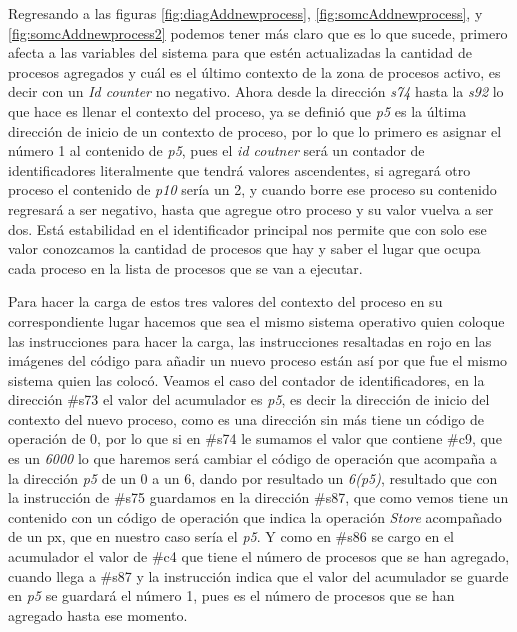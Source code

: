 \documentclass[letterpaper,12pt,oneside]{book}
\begin{document}
			Regresando a las figuras  \ref{fig:diagAddnewprocess}, \ref{fig:somcAddnewprocess}, y \ref{fig:somcAddnewprocess2} podemos tener más claro que es lo que
			sucede, primero afecta a las variables del sistema para que estén actualizadas la cantidad de procesos agregados y cuál es el último
			contexto de la zona de procesos activo, es decir con un \textit{Id counter} no negativo. Ahora desde la dirección \textit{s74} hasta
			la \textit{s92} lo que hace es llenar el contexto del proceso, ya se definió que \textit{p5} es la última dirección de inicio de un contexto
			de proceso, por lo que lo primero es asignar el número 1 al contenido de \textit{p5}, pues el \textit{id coutner} será un contador de identificadores
			literalmente que tendrá valores ascendentes, si agregará otro proceso el contenido de \textit{p10} sería un 2, y cuando borre ese proceso
			su contenido regresará a ser negativo, hasta que agregue otro proceso y su valor vuelva a ser dos. Está estabilidad en el identificador principal
			nos permite que con solo ese valor conozcamos la cantidad de procesos que hay  y saber el lugar que ocupa cada proceso en la lista
			de procesos que se van a ejecutar.
			
			Para hacer la carga de estos tres valores del contexto del proceso en su correspondiente lugar hacemos que sea el mismo sistema operativo
			quien coloque las instrucciones para hacer la carga, las instrucciones resaltadas en rojo en las imágenes del código para añadir
			un nuevo proceso están así por que fue el mismo sistema quien las colocó. Veamos el caso del contador de identificadores, en la dirección
			\#s73 el valor del acumulador es \textit{p5}, es decir la dirección de inicio del contexto del nuevo proceso, como es una dirección sin más
			tiene un código de operación de 0, por lo que si en \#s74 le sumamos el valor que contiene \#c9, que es un \textit{6000} lo que haremos
			será cambiar el código de operación que acompaña a la dirección \textit{p5} de un 0 a un 6, dando por resultado un \textit{6(p5)},
			resultado que con la instrucción de \#s75 guardamos en la dirección \#s87, que como vemos tiene un contenido con un código de operación
			que indica la operación \textit{Store} acompañado de un px, que en nuestro caso sería el \textit{p5}. Y como en \#s86 se cargo
			en el acumulador el valor de \#c4 que tiene el número de procesos que se han agregado, cuando llega a \#s87 y la instrucción indica que
			el valor del acumulador se guarde en \textit{p5} se guardará el número 1, pues es el número de procesos que se han agregado hasta ese momento.
			
\end{document}
